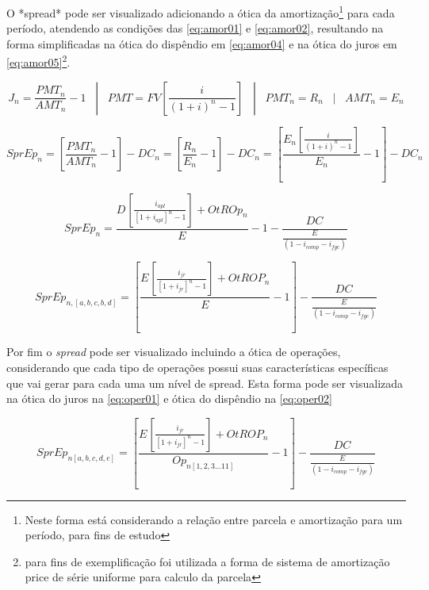 \documentclass[
  12pt,
  12pt,
  openright,
  oneside,
  a4paper,
  chapter=TITLE,
  section=TITLE,
  subsection=TITLE,
  subsubsection=TITLE,
  english,
  portugues,
  sumario=tradicional]{abntex2}
\begin{document}
\begin{apendicesenv}
O *spread* pode ser visualizado adicionando a ótica da amortização\footnote{Neste forma está considerando a relação entre parcela e amortização para um período, para fins de estudo} para cada período, atendendo as condições das \autoref{eq:amor01} e \autoref{eq:amor02}, resultando na forma simplificadas na ótica do dispêndio em \autoref{eq:amor04} e na ótica do juros em \autoref{eq:amor05}\footnote{para fins de exemplificação foi utilizada a forma de sistema de amortização price de série uniforme para calculo da parcela}.


\begin{equation}\label{eq:amor01}
J_{n} = \frac{PMT_{n}}{AMT_{n}} - 1 \hspace{10pt} | \hspace{10pt} PMT = FV[\frac{i}{(1 + i)^n - 1}]  \hspace{10pt} | \hspace{10pt} PMT_{n} = R_{n} \hspace{10pt} | \hspace{10pt} AMT_{n} = E_{n}
\end{equation}



\begin{equation}\label{eq:amor02}
SprEp_{n} = [\frac{PMT_{n}}{AMT_{n}} -1] - DC_{n} = [\frac{R_{n}}{E_{n}} -1] - DC_{n} = [\frac{E_{n}[\frac{i}{(1 + i)^n - 1}]}{E_{n}} -1] - DC_{n}
\end{equation}



\begin{equation}\label{eq:amor04}
SprEp_{n} = \frac{D_{}[\frac{   i_{apl}  }{  [1 + i_{apl}]^n -1  }] + OtROp_{n}}{E_{}} -1 - \frac{DC_{}}{\frac{E_{}}{(1 - i_{comp} - i_{fgc})}}
\end{equation}


\begin{equation}\label{eq:amor05}
SprEp_{n,[a,b,c,b,d]} =  [\frac{E_{}[\frac{   i_{jr}  }{  [1 + i_{jr}]^n -1  }] + OtROP_{n}}{E_{}} -1] - \frac{DC_{}}{\frac{E_{}}{(1 - i_{comp} - i_{fgc})}}
\end{equation}


Por fim o \emph{spread} pode ser visualizado incluindo a ótica de operações, considerando que cada tipo de operações possui suas características específicas que vai gerar para cada uma um nível de spread. Esta forma pode ser visualizada na ótica do juros na \autoref{eq:oper01} e ótica do dispêndio na \autoref{eq:oper02}  


\begin{equation}\label{eq:oper01}
SprEp_{n[a,b,c,d,e]} =  [\frac{E_{}[\frac{   i_{jr}  }{  [1 + i_{jr}]^n -1  }] + OtROP_{n}}{Op_{n[1,2,3...11]}} -1] - \frac{DC_{}}{\frac{E_{}}{(1 - i_{comp} - i_{fgc})}}
\end{equation}



\end{apendicesenv}
\end{document}
